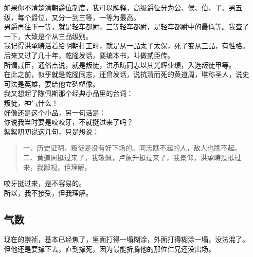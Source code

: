 \begin{multicols}{\theparacolNo}
如果你不清楚清朝爵位制度，我可以解释，高级爵位分为公、侯、伯、子、男五级，每个爵位，又分一到三等，一等为最高。\\

男爵再往下一等，就是轻车都尉，三等轻车都尉，是轻车都尉中的最低等。我查了一下，大致是个从三品级别。\\

我记得洪承畴活着给明朝打工时，就是从一品太子太保，死了变从三品，有性格。\\

后来又过了几十年，乾隆发话，要编本书，叫做贰臣传。\\

所谓贰臣，通俗点说，就是叛徒，洪承畴同志以其光辉业绩，入选叛徒甲等。\\

在此之前，似乎就是乾隆同志，还曾发话，说抗清而死的黄道周，堪称圣人，说史可法是英雄，要给他立碑塑像。\\

我又想起了陈佩斯那个经典小品里的台词：\\

叛徒，神气什么！\\

好像还是这个小品，另一句话是：\\

你说我当时要是咬咬牙，不就挺过来了吗？\\

絮絮叨叨说这几句，只是想说：\\

{\footnotesize \begin{quote}
	一、历史证明，叛徒是没有好下场的。同志瞧不起的人，敌人也瞧不起。\\
	二、黄道周挺过来了，我敬佩，卢象升挺过来了，我景仰，洪承畴没挺过来，我鄙视，但理解。\\
\end{quote}}

咬牙挺过来，是不容易的。\\

所以，我不接受，但我理解。\\

\subsection{气数}
现在的崇祯，基本已经焦了，里面打得一塌糊涂，外面打得糊涂一塌，没法混了。\\

但他还是要撑下去，直到撑死，因为最能折腾他的那位仁兄还没出场。\\


\end{multicols}
